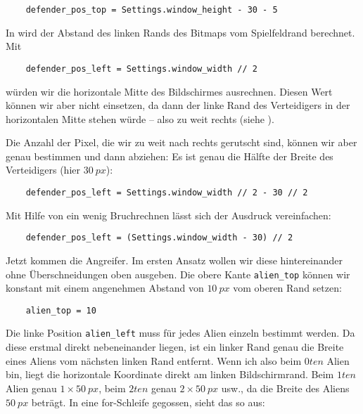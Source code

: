 \lstset{firstnumber=24}
\begin{lstlisting}
	defender_pos_top = Settings.window_height - 30 - 5
\end{lstlisting}

In  wird der Abstand des linken Rands des Bitmaps vom Spielfeldrand berechnet. Mit

\lstset{firstnumber=23}
\begin{lstlisting}
	defender_pos_left = Settings.window_width // 2
\end{lstlisting}

würden wir die horizontale Mitte des Bildschirmes ausrechnen. Diesen Wert können wir aber nicht einsetzen, da dann der linke Rand des Verteidigers in der horizontalen Mitte stehen würde -- also zu weit rechts (siehe ). 


Die Anzahl der Pixel, die wir zu weit nach rechts gerutscht sind, können wir aber genau bestimmen und dann abziehen: Es ist genau die Hälfte der Breite des Verteidigers (hier $30~px$):
\begin{lstlisting}
	defender_pos_left = Settings.window_width // 2 - 30 // 2
\end{lstlisting}

Mit Hilfe von ein wenig Bruchrechnen lässt sich der Ausdruck vereinfachen:
\begin{lstlisting}
	defender_pos_left = (Settings.window_width - 30) // 2
\end{lstlisting}

Jetzt kommen die Angreifer. Im ersten Ansatz wollen wir diese hintereinander ohne Überschneidungen oben ausgeben. Die obere Kante \texttt{alien\_top} können wir konstant mit einem angenehmen Abstand von $10~px$ vom oberen Rand setzen:

\lstset{firstnumber=44}
\begin{lstlisting}
	alien_top = 10 
\end{lstlisting}

Die linke Position \texttt{alien\_left} muss für jedes Alien einzeln bestimmt werden. Da diese erstmal direkt nebeneinander liegen, ist ein linker Rand genau die Breite eines Aliens vom nächsten linken Rand entfernt. Wenn ich also beim $0ten$ Alien bin, liegt die horizontale Koordinate direkt am linken Bildschirmrand. Beim $1ten$ Alien genau $1\times50~px$, beim $2ten$ genau $2\times50~px$ usw., da die Breite des Aliens $50~px$ beträgt. In eine for-Schleife gegossen, sieht das so aus:

